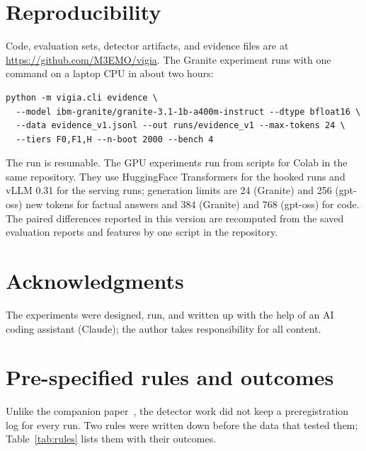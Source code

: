 \documentclass[11pt]{article}
\begin{document}
\section*{Reproducibility}
Code, evaluation sets, detector artifacts, and evidence files are at \url{https://github.com/M3EMO/vigia}.
The Granite experiment runs with one command on a laptop CPU in about two hours:
\begin{verbatim}
python -m vigia.cli evidence \
  --model ibm-granite/granite-3.1-1b-a400m-instruct --dtype bfloat16 \
  --data evidence_v1.jsonl --out runs/evidence_v1 --max-tokens 24 \
  --tiers F0,F1,H --n-boot 2000 --bench 4
\end{verbatim}
The run is resumable. The GPU experiments run from scripts for Colab in the same repository.
They use HuggingFace Transformers for the hooked runs and vLLM 0.31 for the serving runs; generation limits are 24 (Granite) and 256 (gpt-oss) new tokens for factual answers and 384 (Granite) and 768 (gpt-oss) for code.
The paired differences reported in this version are recomputed from the saved evaluation reports and features by one script in the repository.

\section*{Acknowledgments}
The experiments were designed, run, and written up with the help of an AI coding assistant (Claude); the author takes responsibility for all content.




\appendix
\section{Pre-specified rules and outcomes}
\label{app:rules}

Unlike the companion paper~\citep{companion2026forgetting}, the detector work did not keep a preregistration log for every run.
Two rules were written down before the data that tested them; Table~\ref{tab:rules} lists them with their outcomes.
\end{document}
